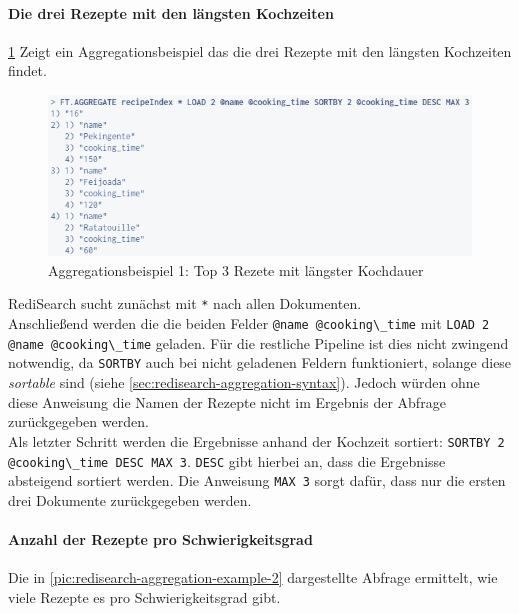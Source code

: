\paragraph{Die drei Rezepte mit den längsten Kochzeiten}
\cref{pic:redisearch-aggregation-example-1} Zeigt ein Aggregationsbeispiel das die drei Rezepte mit den längsten Kochzeiten findet.\\
\begin{figure}[ht]  %
    \centering      %
    \includegraphics[width=1\textwidth]{pictures/redis/redisearch_aggregation_example_1.png}
    \caption{Aggregationsbeispiel 1: Top 3 Rezete mit längster Kochdauer}      %
    \label{pic:redisearch-aggregation-example-1}    %
\end{figure}

RediSearch sucht zunächst mit \lstinline|*| nach allen Dokumenten.\\
Anschließend werden die die beiden Felder \lstinline|@name @cooking\_time| mit \lstinline|LOAD 2 @name @cooking\_time|  geladen. Für die restliche Pipeline ist dies nicht zwingend notwendig, da \lstinline|SORTBY| auch bei nicht geladenen Feldern funktioniert, solange diese \emph{sortable} sind (siehe \ref{sec:redisearch-aggregation-syntax}). Jedoch würden ohne diese Anweisung die Namen der Rezepte nicht im Ergebnis der Abfrage zurückgegeben werden.\\
Als letzter Schritt werden die Ergebnisse anhand der Kochzeit sortiert: \lstinline|SORTBY 2 @cooking\_time DESC MAX 3|. \lstinline|DESC| gibt hierbei an, dass die Ergebnisse absteigend sortiert werden. Die Anweisung \lstinline|MAX 3| sorgt dafür, dass nur die ersten drei Dokumente zurückgegeben werden.


\paragraph{Anzahl der Rezepte pro Schwierigkeitsgrad}
Die in \cref{pic:redisearch-aggregation-example-2} dargestellte Abfrage ermittelt, wie viele Rezepte es pro Schwierigkeitsgrad gibt.

